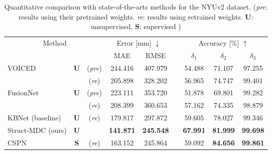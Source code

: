 \begin{table}[!t]
\centering
\renewcommand{\arraystretch}{1.10} \renewcommand{\tabcolsep}{0.8mm}  \caption{Quantitative comparison with state-of-the-arts \textcolor{color1}{methods} for the NYUv2 \textcolor{color1}{dataset}.
(\textit{pre}: results using their pretrained weights. 
\textit{re}: results using retrained weights.
\textbf{U}: unsupervised, \textbf{S}: supervised
)}


\begin{tabular}{lcccccccc}
\hline
\multicolumn{3}{c}{Method}                                       & \multicolumn{2}{c}{Error {[}mm{]} $\downarrow$} & \multicolumn{1}{l}{} & \multicolumn{3}{c}{Accuracy {[}\%{]} $\uparrow$}    \\ \cline{4-5} \cline{7-9} 
\multicolumn{3}{c}{}                                             & MAE                    & RMSE                   & \multicolumn{1}{l}{} & $\delta_1$      & $\delta_2$      & $\delta_3$      \\ \hline
\multirow{2}{*}{\textcolor{color2}{VOICED~\cite{void}}}             & \multirow{2}{*}{\textbf{U}} & (\textit{pre}) & 244.416                & 407.979                &                      & 54.488          & 71.107          & 97.255          \\
                                    &                    & (\textit{re})  & 205.898                & 328.202                &                      & 56.965          & 74.747          & 99.401          \\
\multirow{2}{*}{\textcolor{color2}{FusionNet~\cite{learning_top}}} & \multirow{2}{*}{\textbf{U}} & (\textit{pre}) & 223.111                & 353.720                &                      & 51.878          & 69.801          & 99.282          \\
                                    &                    & (\textit{re})  & 208.399                & 360.653                &                      & 57.162          & 74.335          & 98.879          \\
\textcolor{color2}{KBNet (baseline)~\cite{baseline}}                    & \textbf{U}                  & (\textit{re})  & 179.817                & 297.872                &                      & 59.605          & 78.027          & 99.346          \\
Struct-MDC (ours)                                & \textbf{U}                  &       & \textbf{141.871}       & \textbf{245.548}       &                      & \textbf{67.991} & \textbf{81.999} & \textbf{99.698} \\ \hline
\textcolor{color2}{CSPN~\cite{cspn}}                                & \textbf{S}                  & (\textit{re})  & 163.152                & 245.864                &                      & 59.092          & \textbf{84.656} & \textbf{99.861} \\ \hline
\end{tabular}


\label{table:exp_nyu}
\end{table}


